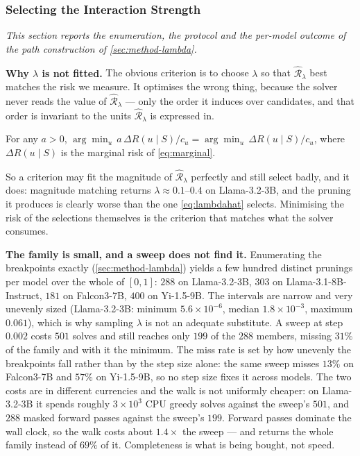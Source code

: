 \subsubsection{Selecting the Interaction Strength}
\label{app:lambda}
\emph{This section reports the enumeration, the protocol and the per-model outcome of the path
construction of \cref{sec:method-lambda}.}

\textbf{Why $\lambda$ is not fitted.} The obvious criterion is to choose $\lambda$ so that
$\widehat{\mathcal R}_\lambda$ best matches the risk we measure. It optimises the wrong thing, because the
solver never reads the value of $\widehat{\mathcal R}_\lambda$ --- only the order it induces over candidates,
and that order is invariant to the units $\widehat{\mathcal R}_\lambda$ is expressed in.
\begin{lemma}\label{lem:scale}
For any $a>0$, $\arg\min_{u}\,a\,\Delta R(u\mid S)/c_u=\arg\min_{u}\,\Delta R(u\mid S)/c_u$, where
$\Delta R(u\mid S)$ is the marginal risk of \cref{eq:marginal}.
\end{lemma}
\noindent So a criterion may fit the magnitude of $\widehat{\mathcal R}_\lambda$ perfectly and still select
badly, and it does: magnitude matching returns $\lambda\approx0.1$--$0.4$ on Llama-3.2-3B, and the
pruning it produces is clearly worse than the one \cref{eq:lambdahat} selects. Minimising the risk of
the selections themselves is the criterion that matches what the solver consumes.

\textbf{The family is small, and a sweep does not find it.} Enumerating the breakpoints exactly
(\cref{sec:method-lambda}) yields a few hundred distinct prunings per model over the whole of
$[0,1]$: $288$ on Llama-3.2-3B, $303$ on Llama-3.1-8B-Instruct, $181$ on Falcon3-7B, $400$ on
Yi-1.5-9B. The intervals are narrow and very unevenly sized (Llama-3.2-3B: minimum
$5.6\times10^{-6}$, median $1.8\times10^{-3}$, maximum $0.061$), which is why sampling $\lambda$ is
not an adequate substitute. A sweep at step $0.002$ costs $501$ solves and still reaches only $199$
of the $288$ members, missing $31\%$ of the family and with it the minimum. The miss rate is set by how
unevenly the breakpoints fall rather than by the step size alone: the same sweep misses $13\%$ on
Falcon3-7B and $57\%$ on Yi-1.5-9B, so no step size fixes it across models. The two costs are in different currencies and the walk is not
uniformly cheaper: on Llama-3.2-3B it spends roughly $3\times10^{3}$ CPU greedy solves against the
sweep's $501$, and $288$ masked forward passes against the sweep's $199$. Forward passes dominate the
wall clock, so the walk costs about $1.4\times$ the sweep --- and returns the whole family instead of
$69\%$ of it. Completeness is what is being bought, not speed.

